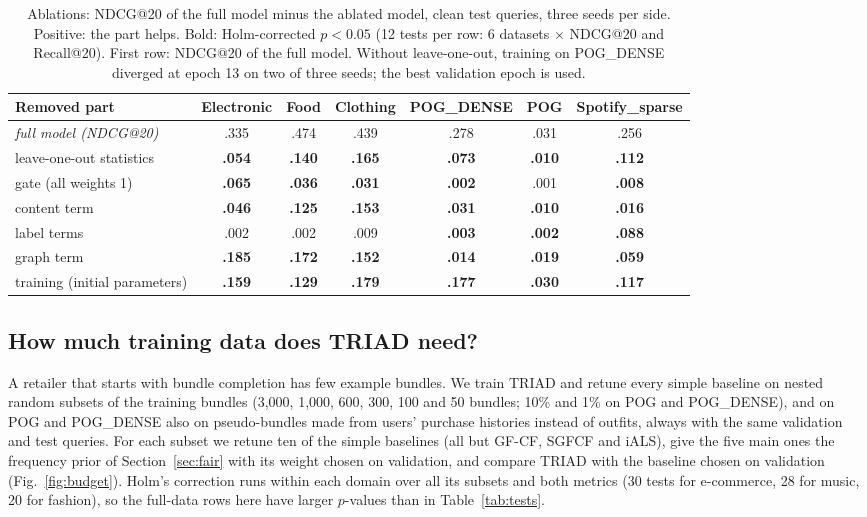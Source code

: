 \documentclass[runningheads]{llncs}
\begin{document}
\begin{table}[t]
\centering
\caption{Ablations: NDCG@20 of the full model minus the ablated model, clean test queries, three seeds per side.
Positive: the part helps. Bold: Holm-corrected $p<0.05$ (12 tests per row: 6 datasets $\times$ NDCG@20 and
Recall@20). First row: NDCG@20 of the full model. Without leave-one-out, training on POG\_DENSE diverged at epoch 13 on
two of three seeds; the best validation epoch is used.}
\label{tab:ablation}
\setlength{\tabcolsep}{3pt}
\scriptsize
\begin{tabular}{lcccccc}
\toprule
Removed part & Electronic & Food & Clothing & POG\_DENSE & POG & Spotify\_sparse\\
\midrule
\emph{full model (NDCG@20)} & .335 & .474 & .439 & .278 & .031 & .256\\
\midrule
leave-one-out statistics & \textbf{.054} & \textbf{.140} & \textbf{.165} & \textbf{.073} & \textbf{.010} & \textbf{.112}\\
gate (all weights 1) & \textbf{.065} & \textbf{.036} & \textbf{.031} & \textbf{.002} & .001 & \textbf{.008}\\
content term & \textbf{.046} & \textbf{.125} & \textbf{.153} & \textbf{.031} & \textbf{.010} & \textbf{.016}\\
label terms & .002 & .002 & .009 & \textbf{.003} & \textbf{.002} & \textbf{.088}\\
graph term & \textbf{.185} & \textbf{.172} & \textbf{.152} & \textbf{.014} & \textbf{.019} & \textbf{.059}\\
training (initial parameters) & \textbf{.159} & \textbf{.129} & \textbf{.179} & \textbf{.177} & \textbf{.030} & \textbf{.117}\\
\bottomrule
\end{tabular}
\end{table}

\subsection{How much training data does TRIAD need?}
\label{sec:budget}

A retailer that starts with bundle completion has few example bundles. We train TRIAD and retune every simple
baseline on nested random subsets of the training bundles (3,000, 1,000, 600, 300, 100 and 50 bundles; 10\% and 1\% on POG
and POG\_DENSE), and on POG and POG\_DENSE also on pseudo-bundles made from users' purchase histories instead of
outfits, always with the same validation and test queries. For each subset we retune ten of the simple baselines (all but GF-CF, SGFCF and iALS),
give the five main ones the frequency prior of Section~\ref{sec:fair} with its weight chosen on validation, and
compare TRIAD with the baseline chosen on validation (Fig.~\ref{fig:budget}). Holm's correction runs within each
domain over all its subsets and both metrics (30 tests for e-commerce, 28 for music, 20 for fashion), so the
full-data rows here have larger $p$-values than in Table~\ref{tab:tests}.
\end{document}

